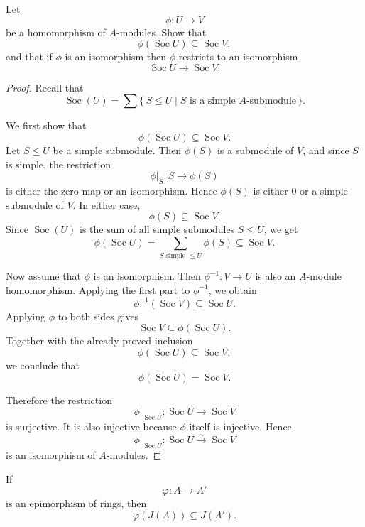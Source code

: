 \begin{exercise}
    Let
    \[
        \phi \colon U \to V
    \]
    be a homomorphism of \(A\)-modules. Show that
    \[
        \phi(\operatorname{Soc} U) \subseteq \operatorname{Soc} V,
    \]
    and that if \(\phi\) is an isomorphism then \(\phi\) restricts to an isomorphism
    \[
        \operatorname{Soc} U \to \operatorname{Soc} V.
    \]
\end{exercise}

\begin{proof}
    Recall that
    \[
        \operatorname{Soc}(U)=\sum \{\,S\leq U \mid S \text{ is a simple } A\text{-submodule}\,\}.
    \]

    We first show that
    \[
        \phi(\operatorname{Soc} U)\subseteq \operatorname{Soc} V.
    \]
    Let \(S\leq U\) be a simple submodule. Then \(\phi(S)\) is a submodule of \(V\), and since
    \(S\) is simple, the restriction
    \[
        \phi|_S \colon S\to \phi(S)
    \]
    is either the zero map or an isomorphism. Hence \(\phi(S)\) is either \(0\) or a simple
    submodule of \(V\). In either case,
    \[
        \phi(S)\subseteq \operatorname{Soc} V.
    \]
    Since \(\operatorname{Soc}(U)\) is the sum of all simple submodules \(S\le U\), we get
    \[
        \phi(\operatorname{Soc} U)
        =
        \sum_{S\text{ simple }\le U}\phi(S)
        \subseteq \operatorname{Soc} V.
    \]

    Now assume that \(\phi\) is an isomorphism. Then \(\phi^{-1}\colon V\to U\) is also an
    \(A\)-module homomorphism. Applying the first part to \(\phi^{-1}\), we obtain
    \[
        \phi^{-1}(\operatorname{Soc} V)\subseteq \operatorname{Soc} U.
    \]
    Applying \(\phi\) to both sides gives
    \[
        \operatorname{Soc} V \subseteq \phi(\operatorname{Soc} U).
    \]
    Together with the already proved inclusion
    \[
        \phi(\operatorname{Soc} U)\subseteq \operatorname{Soc} V,
    \]
    we conclude that
    \[
        \phi(\operatorname{Soc} U)=\operatorname{Soc} V.
    \]

    Therefore the restriction
    \[
        \phi|_{\operatorname{Soc} U}\colon \operatorname{Soc} U\to \operatorname{Soc} V
    \]
    is surjective. It is also injective because \(\phi\) itself is injective. Hence
    \[
        \phi|_{\operatorname{Soc} U}\colon \operatorname{Soc} U \xrightarrow{\sim} \operatorname{Soc} V
    \]
    is an isomorphism of \(A\)-modules.
\end{proof}

\begin{exercise}
    If
    \[
        \varphi \colon A \to A'
    \]
    is an epimorphism of rings, then
    \[
        \varphi(J(A)) \subseteq J(A').
    \]
\end{exercise}

